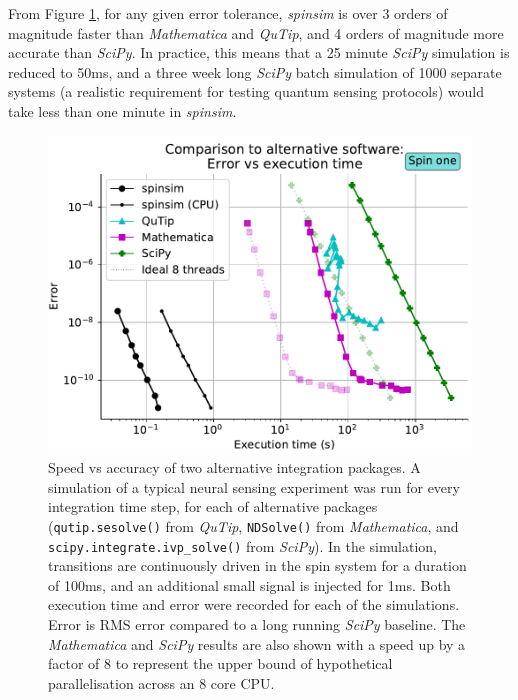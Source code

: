 \documentclass{jors}
\begin{document}
		From Figure \ref{fig:benchmark_external}, for any given error tolerance, \emph{spinsim} is over 3 orders of magnitude faster than \emph{Mathematica} and \emph{QuTip}, and 4 orders of magnitude more accurate than \emph{SciPy}.
		In practice, this means that a 25 minute \emph{SciPy} simulation is reduced to 50ms, and a three week long \emph{SciPy} batch simulation of 1000 separate systems (a realistic requirement for testing quantum sensing protocols) would take less than one minute in \emph{spinsim}.
		\begin{figure}[h!]
			\includegraphics[scale=0.9]{benchmark_external_execution_error.pdf}
			\caption{Speed vs accuracy of two alternative integration packages.
			A simulation of a typical neural sensing experiment was run for every integration time step, for each of alternative packages (\texttt{qutip.sesolve()} from \emph{QuTip}, \texttt{NDSolve()} from \emph{Mathematica}, and \texttt{scipy.integrate.ivp\_solve()} from \emph{SciPy}).
			In the simulation, transitions are continuously driven in the spin system for a duration of 100ms, and an additional small signal is injected for 1ms.
			Both execution time and error were recorded for each of the simulations.
			Error is RMS error compared to a long running \emph{SciPy} baseline.
			The \emph{Mathematica} and \emph{SciPy} results are also shown with a speed up by a factor of 8 to represent the upper bound of hypothetical parallelisation across an 8 core CPU.}
			\label{fig:benchmark_external}
		\end{figure}
\end{document}
